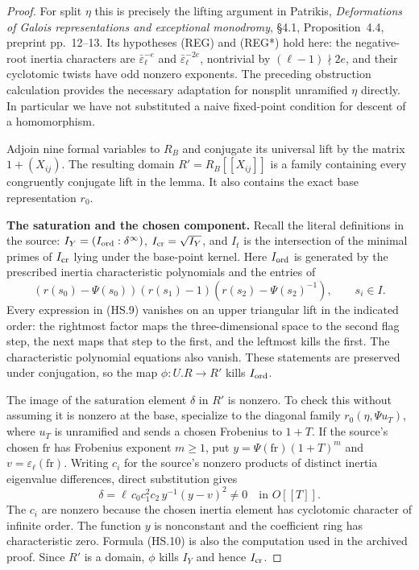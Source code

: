 \documentclass[11pt,a4paper]{article}
\theoremstyle{definition}
\renewcommand{\paragraph}[1]{\par\smallskip\noindent\textbf{#1}\quad\ignorespaces}
\begin{document}
\begin{proof}
For split $\eta$ this is precisely the lifting argument in
Patrikis, \emph{Deformations of Galois representations and
exceptional monodromy}, \S4.1, Proposition~4.4, preprint
pp.~12--13.  Its hypotheses \textnormal{(REG)} and
\textnormal{(REG*)} hold here: the negative-root inertia
characters are $\bar\varepsilon_\ell^{-e}$ and
$\bar\varepsilon_\ell^{-2e}$, nontrivial by
$(\ell-1)\nmid2e$, and their cyclotomic twists have odd
nonzero exponents.  The preceding obstruction calculation
provides the necessary adaptation for nonsplit unramified
$\eta$ directly.  In particular we have not substituted a
naive fixed-point condition for descent of a homomorphism.

Adjoin nine formal variables to $R_B$ and conjugate its
universal lift by the matrix $1+(X_{ij})$.  The resulting
domain $R'=R_B[[X_{ij}]]$ is a family containing every
congruently conjugate lift in the lemma.  It also contains
the exact base representation $r_0$.

\paragraph{The saturation and the chosen component.}
Recall the literal definitions in the source:
$I_Y=(I_{\rm ord}:\delta^\infty)$,
$I_{\rm cr}=\sqrt{I_Y}$, and $I_t$ is the intersection of
the minimal primes of $I_{\rm cr}$ lying under the base-point
kernel.  Here $I_{\rm ord}$ is generated by the prescribed
inertia characteristic polynomials and the entries of
\[
 (r(s_0)-\Psi(s_0))
 (r(s_1)-1)
 (r(s_2)-\Psi(s_2)^{-1}),\qquad s_i\in I.                   \tag{HS.9}
\]
Every expression in (HS.9) vanishes on an upper triangular
lift in the indicated order: the rightmost factor maps the
three-dimensional space to the second flag step, the next
maps that step to the first, and the leftmost kills the first.
The characteristic polynomial equations also vanish.  These
statements are preserved under conjugation, so the map
$\phi:U.R\to R'$ kills $I_{\rm ord}$.

The image of the saturation element $\delta$ in $R'$ is
nonzero.  To check this without assuming it is nonzero at
the base, specialize to the diagonal family
$r_0(\eta,\Psi u_T)$, where $u_T$ is unramified and sends
a chosen Frobenius to $1+T$.  If the source's chosen
$\mathrm{fr}$ has Frobenius exponent $m\geq1$, put
$y=\Psi(\mathrm{fr})(1+T)^m$ and
$v=\varepsilon_\ell(\mathrm{fr})$.  Writing $c_i$ for the
source's nonzero products of distinct inertia eigenvalue
differences, direct substitution gives
\[
 \delta=\ell\,c_0c_1^2c_2\,y^{-1}(y-v)^2\ne0
                                  \quad\text{in }O[[T]].     \tag{HS.10}
\]
The $c_i$ are nonzero because the chosen inertia element has
cyclotomic character of infinite order.  The function $y$ is
nonconstant and the coefficient ring has characteristic zero.
Formula (HS.10) is also the computation used in the archived
 proof.  Since $R'$ is a domain,
$\phi$ kills $I_Y$ and hence $I_{\rm cr}$.


\end{proof}
\end{document}
